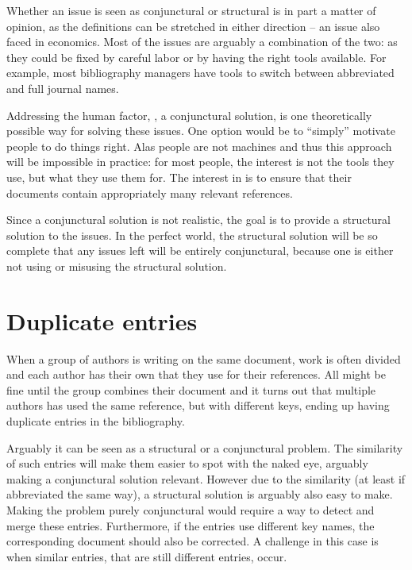 Whether an issue is seen as conjunctural or structural is in part a
matter of opinion, as the definitions can be stretched in either
direction -- an issue also faced in economics.  Most of the issues are
arguably a combination of the two: as they could be fixed by careful
labor or by having the right tools available.  For example, most
bibliography managers have tools to switch between abbreviated and
full journal names.

Addressing the human factor, \ie, a conjunctural solution, is one
theoretically possible way for solving these issues.  One option would
be to ``simply'' motivate people to do things right.  Alas people are
not machines and thus this approach will be impossible in practice:
for most people, the interest is not the tools they use, but what they
use them for.  The interest in {\bibtex} is to ensure that their
documents contain appropriately many relevant references.

Since a conjunctural solution is not realistic, the goal is to provide
a structural solution to the issues.  In the perfect world, the
structural solution will be so complete that any issues left will be
entirely conjunctural, because one is either not using or misusing the
structural solution.


\section{Duplicate entries}
\label{sec:problems_duplicates}

When a group of authors is writing on the same document, work is often
divided and each author has their own  that they use for
their references.  All might be fine until the group combines their
document and it turns out that multiple authors has used the same
reference, but with different keys, ending up having duplicate entries
in the bibliography.

Arguably it can be seen as a structural or a conjunctural problem.
The similarity of such entries will make them easier to spot with the
naked eye, arguably making a conjunctural solution relevant.  However
due to the similarity (at least if abbreviated the same way), a
structural solution is arguably also easy to make.  Making the problem
purely conjunctural would require a way to detect and merge these
entries.  Furthermore, if the entries use different key names, the
corresponding document should also be corrected. A challenge in this
case is when similar entries, that are still different entries, occur.

